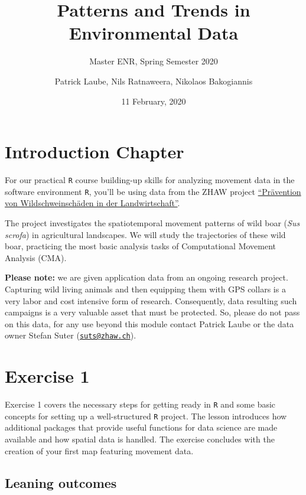 \documentclass[]{book}
\title{Patterns and Trends in Environmental Data}
\subtitle{Master ENR, Spring Semester 2020}
\author{Patrick Laube, Nils Ratnaweera, Nikolaos Bakogiannis}
\date{11 February, 2020}
\begin{document}
\maketitle

{
\setcounter{tocdepth}{1}
\tableofcontents
}
\hypertarget{introduction-chapter}{%
\chapter*{Introduction Chapter}\label{introduction-chapter}}

For our practical \texttt{R} course building-up skills for analyzing movement data in the software environment \texttt{R}, you'll be using data from the ZHAW project \href{https://www.zhaw.ch/de/lsfm/institute-zentren/iunr/integrative-oekologie/wildtiermanagement/referenzprojekte/}{``Prävention von Wildschweinschäden in der Landwirtschaft''}.

The project investigates the spatiotemporal movement patterns of wild boar (\emph{Sus scrofa}) in agricultural landscapes. We will study the trajectories of these wild boar, practicing the most basic analysis tasks of Computational Movement Analysis (CMA).

\textbf{Please note:} we are given application data from an ongoing research project. Capturing wild living animals and then equipping them with GPS collars is a very labor and cost intensive form of research. Consequently, data resulting such campaigns is a very valuable asset that must be protected. So, please do not pass on this data, for any use beyond this module contact Patrick Laube or the data owner Stefan Suter (\href{mailto:suts@zhaw.ch}{\nolinkurl{suts@zhaw.ch}}).

\hypertarget{exercise-1}{%
\chapter{Exercise 1}\label{exercise-1}}

Exercise 1 covers the necessary steps for getting ready in \texttt{R} and some basic concepts for setting up a well-structured \texttt{R} project. The lesson introduces how additional packages that provide useful functions for data science are made available and how spatial data is handled. The exercise concludes with the creation of your first map featuring movement data.

\hypertarget{leaning-outcomes}{%
\section{Leaning outcomes}\label{leaning-outcomes}}
\end{document}

